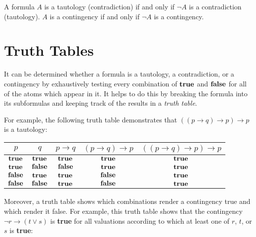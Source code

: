 \documentclass{article}
\begin{document}
\begin{proposition}
A formula $A$ is a tautology (contradiction) if and only if $\neg A$ is a contradiction (tautology). $A$ is a contingency if and only if $\neg A$ is a contingency.
\end{proposition}

\section*{Truth Tables}

It can be determined whether a formula is a tautology, a contradiction, or a contingency by exhaustively testing every combination of $\mathbf{true}$ and $\mathbf{false}$ for all of the atoms which appear in it. It helps to do this by breaking the formula into its subformulas and keeping track of the results in a \emph{truth table}.

For example, the following truth table demonstrates that $((p \to q) \to p) \to p$ is a tautology:

\begin{center}
\begin{tabular}{c|c||c|c|c}
    $p$ & $q$ & $p \to q$ & $(p \to q) \to p$ & $((p \to q) \to p) \to p$ \\
    \hline
    $\mathbf{true}$  & $\mathbf{true}$  & $\mathbf{true}$  & $\mathbf{true}$  & $\mathbf{true}$ \\
    $\mathbf{true}$  & $\mathbf{false}$ & $\mathbf{false}$ & $\mathbf{true}$  & $\mathbf{true}$ \\
    $\mathbf{false}$ & $\mathbf{true}$  & $\mathbf{true}$  & $\mathbf{false}$ & $\mathbf{true}$ \\
    $\mathbf{false}$ & $\mathbf{false}$ & $\mathbf{true}$  & $\mathbf{false}$ & $\mathbf{true}$ \\
\end{tabular}
\end{center}

Moreover, a truth table shows which combinations render a contingency true and which render it false. For example, this truth table shows that the contingency $\neg r \to (t \vee s)$ is \textbf{true} for all valuations according to which at least one of $r$, $t$, or $s$ is \textbf{true}:
\end{document}
